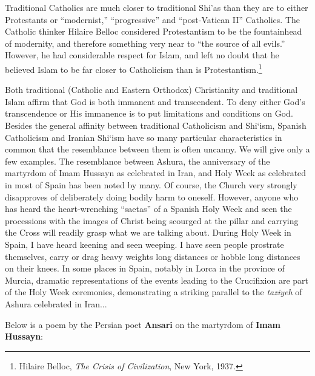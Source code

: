 Traditional Catholics are much closer to traditional Shi'as than they are to either Protestants or ``modernist,'' ``progressive'' and ``post-Vatican II'' Catholics. The Catholic thinker Hilaire Belloc considered Protestantism to be the fountainhead of modernity, and therefore something very near to ``the source of all evils.'' However, he had considerable respect for Islam, and left no doubt that he believed Islam to be far closer to Catholicism than is Protestantism.\footnote{Hilaire Belloc, \emph{The Crisis of Civilization}, New York, 1937.}

Both traditional (Catholic and Eastern Orthodox) Christianity and traditional Islam affirm that God is both immanent and transcendent. To deny either God's transcendence or His immanence is to put limitations and conditions on God. Besides the general affinity between traditional Catholicism and Shi`ism, Spanish Catholicism and Iranian Shi`ism have so many particular characteristics in common that the resemblance between them is often uncanny. We will give only a few examples. The resemblance between Ashura, the anniversary of the martyrdom of Imam Hussayn as celebrated in Iran, and Holy Week as celebrated in most of Spain has been noted by many. Of course, the Church very strongly disapproves of deliberately doing bodily harm to oneself. However, anyone who has heard the heart-wrenching ``saetas'' of a Spanish Holy Week and seen the processions with the images of Christ being scourged at the pillar and carrying the Cross will readily grasp what we are talking about. During Holy Week in Spain, I have heard keening and seen weeping. I have seen people prostrate themselves, carry or drag heavy weights long distances or hobble long distances on their knees. In some places in Spain, notably in Lorca in the province of Murcia, dramatic representations of the events leading to the Crucifixion are part of the Holy Week ceremonies, demonstrating a striking parallel to the \emph{taziyeh} of Ashura celebrated in Iran...

Below is a poem by the Persian poet \textbf{Ansari} on the martyrdom of \textbf{Imam Hussayn}:

